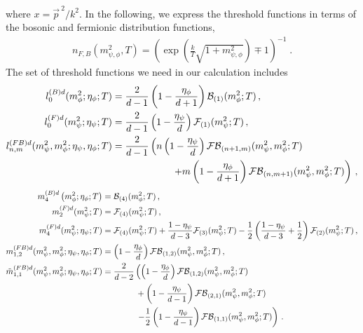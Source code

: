 \documentclass[aps,prd,11pt,tightenlines,superscriptaddress,nofootinbib,preprintnumbers,notitlepage]{revtex4-1}
\newcommand{\qqquad}{\qquad \qquad}
\begin{document}
%
where  $x={\vec p\,}^2/k^2$.
In the following, we express the threshold functions in terms of
the bosonic and fermionic distribution functions,
%
\begin{align}
  n_{F,B}(m_{\psi,\phi}^2,T) = \left(\exp\left(\frac{k}{T} \sqrt{1+m_{\psi,\phi}^2}\right)\mp 1\right)^{-1}\; .
\end{align}
%
The set of threshold functions we need in our calculation includes
%
\begin{align}
 l_0^{(B)d}(m_\phi^2;\eta_\phi;T) ={}& \frac{2}{d-1} \left(1-\frac{\eta_\phi}{d+1}\right) \mathcal{B}_{(1)} (m_\phi^2;T) \,,\notag \\
 l_0^{(F)d}(m_\psi^2;\eta_\psi;T) ={}& \frac{2}{d-1} \left(1-\frac{\eta_\psi}{d}\right) \mathcal{F}_{(1)} (m_\psi^2;T) \,,\notag \\
 l_{n,m}^{(FB)d}(m_\psi^2,m_\phi^2;\eta_\psi,\eta_\phi;T) ={}& \frac{2}{d-1} 
 \left(n \left( 1 - \frac{\eta_\psi}d \right) \mathcal{FB}_{(n+1,m)}(m_\psi^2,m_\phi^2;T)\right.  
 \notag \\&\left.\hspace{1.7cm}
 + m \left( 1 - \frac{\eta_\phi}{d+1} \right) \mathcal{FB}_{(n,m+1)}(m_\psi^2,m_\phi^2;T) \right) \,,\notag 
 \end{align}
 \begin{align}
 m_4^{(B)d}\left(m_\phi^2;\eta_\phi;T\right) &= \mathcal{B}_{(4)}(m_\phi^2;T) \,,\notag \\
 m_{2}^{(F)d}(m_\psi^2;T) &= \mathcal{F}_{(4)}(m_\psi^2;T)  \,,\notag \\
 m_{4}^{(F)d}(m_\psi^2;\eta_\psi;T) &= \mathcal{F}_{(4)}(m_\psi^2;T) 
 + \frac{1- \eta_\psi}{d-3} \mathcal{F}_{(3)}(m_\psi^2;T) 
 - \frac12\left(\frac{1- \eta_\psi}{ d - 3}  + \frac{1}{2} \right) \mathcal{F}_{(2)}(m_\psi^2;T) \,,\notag \\
 m_{1,2}^{(FB)d}(m_\psi^2,m_\phi^2;\eta_\psi,\eta_\phi;T) &= 
 \left(1- \frac{\eta_\phi}d\right) \mathcal{FB}_{(1,2)}(m_\psi^2,m_\phi^2;T) \,,\notag \\
 \tilde{m}_{1,1}^{(FB)d}(m_\psi^2,m_\phi^2;\eta_\psi,\eta_\phi;T) &= 
 \frac{2}{d-2} \left( \left(1- \frac{\eta_\phi}d\right) \mathcal{FB}_{(1,2)}(m_\psi^2,m_\phi^2;T) \right. \notag \\
 &\qqquad+  \left(1- \frac{\eta_\psi}{d-1}\right) \mathcal{FB}_{(2,1)}(m_\psi^2,m_\phi^2;T) \notag \\
 &\qqquad\left.- \frac{1}{2} \left(1- \frac{\eta_\psi}{d-1}\right) \mathcal{FB}_{(1,1)}(m_\psi^2,m_\phi^2;T) \right) \,.
\end{align}
\end{document}
